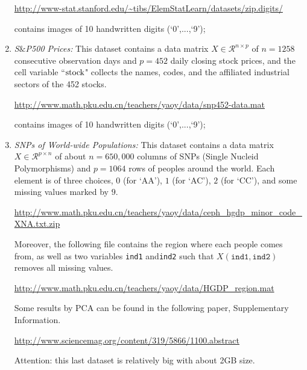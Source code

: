 \documentclass[11pt]{article}
\def\R{{\mathcal R}}
\begin{document}
\begin{enumerate}
\url{http://www-stat.stanford.edu/\~tibs/ElemStatLearn/datasets/zip.digits/}

contains images of 10 handwritten digits (`$0$',...,`9');

\item {\em S$\&$P500 Prices:} This dataset contains a data matrix $X\in \R^{n\times p}$ of $n=1258$ consecutive observation days and $p=452$ daily closing stock prices, and the cell variable ``${\rm stock}$" collects the names, codes, and the affiliated industrial sectors of the 452 stocks.

\url{http://www.math.pku.edu.cn/teachers/yaoy/data/snp452-data.mat}

contains images of 10 handwritten digits (`$0$',...,`9');

\item {\em SNPs of World-wide Populations:} This dataset contains a data matrix $X\in \R^{p\times n}$ of about $n=650,000$ columns of SNPs (Single Nucleid Polymorphisms) and $p=1064$ rows of peoples around the world. Each element is of three choices, $0$ (for `AA'), $1$ (for `AC'), $2$ (for `CC'), and some missing values marked by $9$. 

\url{http://www.math.pku.edu.cn/teachers/yaoy/data/ceph_hgdp_minor_code_XNA.txt.zip}

Moreover, the following file contains the region where each people comes from, as well as two variables {\texttt{ind1}} and{\texttt{ind2}} such that $X({\texttt{ind1}},{\texttt{ind2}})$ removes all missing values. 

\url{http://www.math.pku.edu.cn/teachers/yaoy/data/HGDP_region.mat}

Some results by PCA can be found in the following paper, Supplementary Information. 

\url{http://www.sciencemag.org/content/319/5866/1100.abstract}

Attention: this last dataset is relatively big with about 2GB size. 

\end{enumerate}
\end{document}
